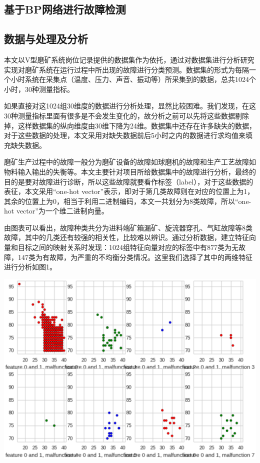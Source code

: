 \documentclass{ctacn}%
\begin{document}
\begin{multicols}{2}


\section{基于BP网络进行故障检测}

\subsection{数据与处理及分析}
本文以V型磨矿系统岗位记录提供的数据集作为依托，通过对数据集进行分析研究实现对磨矿系统在运行过程中所出现的故障进行分类预测。数据集的形式为每隔一个小时系统在采集点（温度、压力、声音、振动等）所采集到的数据，总共1024个小时，30种测量指标。

如果直接对这1024组30维度的数据进行分析处理，显然比较困难。我们发现，在这30种测量指标里面有很多是不会发生变化的，故分析之前可以先将这些数据剔除掉，这样数据集的纵向维度由30维下降为24维。数据集中还存在许多缺失的数据，对于这些数据的处理，本文采用对缺失数据前后5小时之内的数据进行求均值来填充缺失数据。

磨矿生产过程中的故障一般分为磨矿设备的故障如球磨机的故障和生产工艺故障如物料输入输出的失衡等。本文主要针对项目所给数据集中的故障进行分析，最终的目的是要对故障进行诊断，所以这些故障就要看作标签（label），对于这些数据的表征，本文采用“one-hot vector”表示，即对于第几类故障则在对应的位置上为1，其余的位置上为0，相当于利用二进制编码，本文一共划分为8类故障，所以“one-hot vector”为一个维二进制向量。


由图表可以看出，故障种类共分为进料端矿箱漏矿、旋流器穿孔、气缸故障等8类故障，其中的几类还有较强的相关性，比较难以辨识。通过分析数据，建立特征向量和目标之间的映射关系时发现：1024组特征向量对应的标签中有877类为无故障，147类为有故障，为严重的不均衡分类情况。这里我们选择了其中的两维特征进行分析如图1。
\begin{center}
	\includegraphics[scale=0.4, trim=0 0 0 0]{figs/data_features}\\
	\label{fig1}
\end{center}


\end{multicols}
\end{document}
